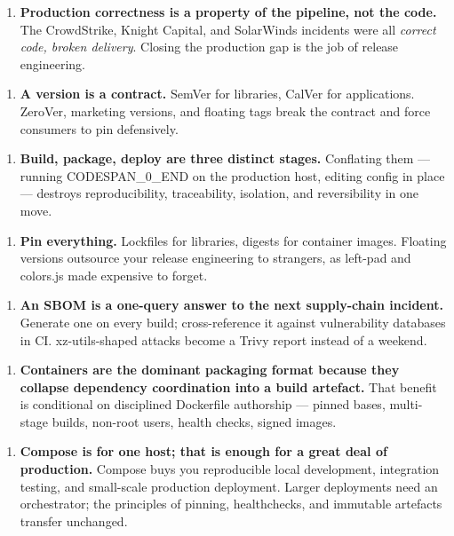 \documentclass[11pt,a4paper]{book}
\begin{document}
\begin{enumerate}
  \item \textbf{Production correctness is a property of the pipeline, not the code.} The CrowdStrike, Knight Capital, and SolarWinds incidents were all \textit{correct code, broken delivery}. Closing the production gap is the job of release engineering.
\end{enumerate}

\begin{enumerate}
  \item \textbf{A version is a contract.} SemVer for libraries, CalVer for applications. ZeroVer, marketing versions, and floating tags break the contract and force consumers to pin defensively.
\end{enumerate}

\begin{enumerate}
  \item \textbf{Build, package, deploy are three distinct stages.} Conflating them --- running CODESPAN\_0\_END on the production host, editing config in place --- destroys reproducibility, traceability, isolation, and reversibility in one move.
\end{enumerate}

\begin{enumerate}
  \item \textbf{Pin everything.} Lockfiles for libraries, digests for container images. Floating versions outsource your release engineering to strangers, as left-pad and colors.js made expensive to forget.
\end{enumerate}

\begin{enumerate}
  \item \textbf{An SBOM is a one-query answer to the next supply-chain incident.} Generate one on every build; cross-reference it against vulnerability databases in CI. xz-utils-shaped attacks become a Trivy report instead of a weekend.
\end{enumerate}

\begin{enumerate}
  \item \textbf{Containers are the dominant packaging format because they collapse dependency coordination into a build artefact.} That benefit is conditional on disciplined Dockerfile authorship --- pinned bases, multi-stage builds, non-root users, health checks, signed images.
\end{enumerate}

\begin{enumerate}
  \item \textbf{Compose is for one host; that is enough for a great deal of production.} Compose buys you reproducible local development, integration testing, and small-scale production deployment. Larger deployments need an orchestrator; the principles of pinning, healthchecks, and immutable artefacts transfer unchanged.
\end{enumerate}
\end{document}
